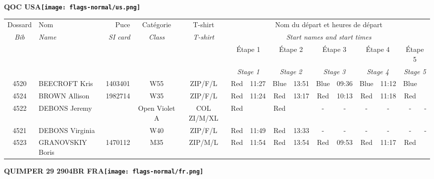 \documentclass{report}
\begin{document}
\newpage
  \Huge \centering \bfseries QOC  USA\normalfont \footnotesize \sffamily \hfill \texttt{[image: flags-normal/us.png]} \newline 
  \begin{longtable}{|c|l|r|c|c|*{5}{cc|}}
    Dossard & Nom  & Puce    & Catégorie & T-shirt & \multicolumn{10}{c|}{Nom du départ et heures de départ} \\
    \itshape Bib     & \itshape Name & \itshape SI card & \itshape Class  & \itshape  T-shirt  & \multicolumn{10}{c|}{\itshape Start names and start times} \\
    \hline
    & & & & & \multicolumn{2}{c|}{Étape 1} & \multicolumn{2}{c|}{Étape 2} & \multicolumn{2}{c|}{Étape 3} & \multicolumn{2}{c|}{Étape 4} & \multicolumn{2}{c|}{Étape 5} \\
    & & & & & \multicolumn{2}{c|}{\itshape Stage 1} & \multicolumn{2}{c|}{\itshape Stage 2} & \multicolumn{2}{c|}{\itshape Stage 3} & \multicolumn{2}{c|}{\itshape Stage 4} & \multicolumn{2}{c|}{\itshape Stage 5} \\
    \hline
    4520 & BEECROFT Kris & 1403401 & W55 & ZIP/F/L & Red & 11:27 & Blue & 13:51 & Blue & 09:36 & Blue & 11:12 & Blue &  \\
    4524 & BROWN Allison & 1982714 & W35 & ZIP/F/L & Red & 11:24 & Red & 13:17 & Red & 10:13 & Red & 11:18 & Red &  \\
    4522 & DEBONS Jeremy &  & Open Violet A & COL ZI/M/XL & Red &   & Red &   & - &  - & - &  - & - &  -\\
    4521 & DEBONS Virginia &  & W40 & ZIP/F/L & Red & 11:49 & Red & 13:33 & - &  - & - &  - & - &  -\\
    4523 & GRANOVSKIY Boris & 1470112 & M35 & ZIP/M/L & Red & 11:54 & Red & 13:54 & Red & 09:53 & Red & 11:17 & Red &  \\
  \end{longtable}
\newpage
  \Huge \centering \bfseries QUIMPER 29 2904BR FRA\normalfont \footnotesize \sffamily \hfill \texttt{[image: flags-normal/fr.png]} \newline 
\end{document}

